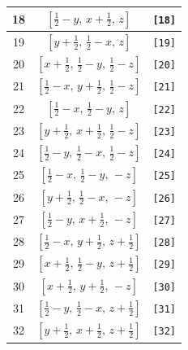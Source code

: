 \documentclass[fleqn,8pt]{jsarticle}
\begin{document}
\begin{longtable}{ccc}
18 & $\left[ \frac{1}{2} - y,\, x + \frac{1}{2},\, z \right]$ & {\tt [18]} \\ \hline
19 & $\left[ y + \frac{1}{2},\, \frac{1}{2} - x,\, z \right]$ & {\tt [19]} \\ \hline
20 & $\left[ x + \frac{1}{2},\, \frac{1}{2} - y,\, \frac{1}{2} - z \right]$ & {\tt [20]} \\ \hline
21 & $\left[ \frac{1}{2} - x,\, y + \frac{1}{2},\, \frac{1}{2} - z \right]$ & {\tt [21]} \\ \hline
22 & $\left[ \frac{1}{2} - x,\, \frac{1}{2} - y,\, z \right]$ & {\tt [22]} \\ \hline
23 & $\left[ y + \frac{1}{2},\, x + \frac{1}{2},\, \frac{1}{2} - z \right]$ & {\tt [23]} \\ \hline
24 & $\left[ \frac{1}{2} - y,\, \frac{1}{2} - x,\, \frac{1}{2} - z \right]$ & {\tt [24]} \\ \hline
25 & $\left[ \frac{1}{2} - x,\, \frac{1}{2} - y,\, - z \right]$ & {\tt [25]} \\ \hline
26 & $\left[ y + \frac{1}{2},\, \frac{1}{2} - x,\, - z \right]$ & {\tt [26]} \\ \hline
27 & $\left[ \frac{1}{2} - y,\, x + \frac{1}{2},\, - z \right]$ & {\tt [27]} \\ \hline
28 & $\left[ \frac{1}{2} - x,\, y + \frac{1}{2},\, z + \frac{1}{2} \right]$ & {\tt [28]} \\ \hline
29 & $\left[ x + \frac{1}{2},\, \frac{1}{2} - y,\, z + \frac{1}{2} \right]$ & {\tt [29]} \\ \hline
30 & $\left[ x + \frac{1}{2},\, y + \frac{1}{2},\, - z \right]$ & {\tt [30]} \\ \hline
31 & $\left[ \frac{1}{2} - y,\, \frac{1}{2} - x,\, z + \frac{1}{2} \right]$ & {\tt [31]} \\ \hline
32 & $\left[ y + \frac{1}{2},\, x + \frac{1}{2},\, z + \frac{1}{2} \right]$ & {\tt [32]} \\
\end{longtable}
\end{document}
